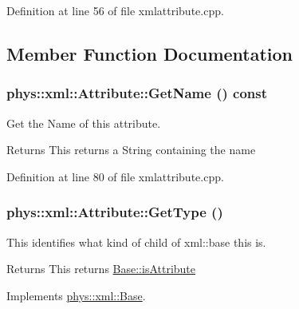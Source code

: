 Definition at line 56 of file xmlattribute.cpp.



\subsection{Member Function Documentation}
\hypertarget{classphys_1_1xml_1_1Attribute_a30314ef60f51e5e161ee4d9e2b6fbd6c}{
\subsubsection[{GetName}]{ phys::xml::Attribute::GetName () const}}
\label{da/ddf/classphys_1_1xml_1_1Attribute_a30314ef60f51e5e161ee4d9e2b6fbd6c}


Get the Name of this attribute. 

\begin{DoxyReturn}{Returns}
This returns a String containing the name 
\end{DoxyReturn}


Definition at line 80 of file xmlattribute.cpp.

\hypertarget{classphys_1_1xml_1_1Attribute_a58ebb56547b77dad9c8cb11eb4558cc9}{
\subsubsection[{GetType}]{ phys::xml::Attribute::GetType ()}}
\label{da/ddf/classphys_1_1xml_1_1Attribute_a58ebb56547b77dad9c8cb11eb4558cc9}


This identifies what kind of child of xml::base this is. 

\begin{DoxyReturn}{Returns}
This returns \hyperlink{classphys_1_1xml_1_1Base_a62ba0484b5ecb502f9ae9d82d3720320af75393e041247190be1c922d0b3faf07}{Base::isAttribute} 
\end{DoxyReturn}


Implements \hyperlink{classphys_1_1xml_1_1Base_af2821c239b5eb31c2524a499bf3ff19f}{phys::xml::Base}.



